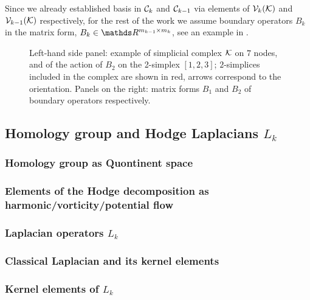 Since we already established basis in \( \mathcal{C}_k \) and \( \mathcal{C}_{k-1}\) via elements of \( \mathcal{V}_{k}(\mathcal{K}) \) and \( \mathcal{V}_{k-1}(\mathcal{K}) \) respectively, for the rest of the work we assume boundary operators \( B_k \) in the matrix form, \( B_k \in \ds R^{ m_{k-1} \times m_k }\), see an example in .
\begin{figure}[hbtp]
      \centering
      
      \caption{
            Left-hand side panel: example of simplicial complex $\mathcal{K}$ on $7$ nodes, and of the action of $B_2$ on the 2-simplex $[1,2,3]$; $2$-simplices included in the complex are shown in red, arrows correspond to the orientation. Panels on the right: matrix forms $B_1$ and $B_2$ of boundary operators respectively. \label{fig:bound_mat}
      }
\end{figure}



\subsection{ Homology group and Hodge Laplacians \( L_k \) }

\subsubsection{Homology group as Quontinent space}

\subsubsection{ Elements of the Hodge decomposition as harmonic/vorticity/potential flow}

\subsubsection{ Laplacian operators \( L_k \) }

\subsubsection{ Classical Laplacian and its kernel elements }

\subsubsection{ Kernel elements of \( L_k \) }


